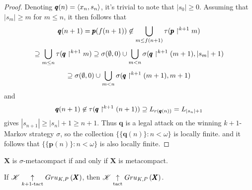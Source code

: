 \begin{proof}
  Denoting $\pmb q(n)=\langle x_n,s_n\rangle$, it's trivial to note that $|s_0|\geq 0$.
  Assuming that $|s_m|\geq m$ for $m\leq n$,
  it then follows that
    \[
      \pmb q(n+1)
        =
      \pmb p(f(n+1))
        \not\in
      \bigcup_{m\leq f(n+1)}\tau(\pmb p\restriction^{k+1} m)
    \]
    \[
        \supseteq
      \bigcup_{m\leq n}\tau(\pmb q\restriction^{k+1} m)
        \supseteq
      \sigma(\emptyset,0)
        \cup
      \bigcup_{m < n}\sigma(\pmb q\restriction^{k+1} (m+1),|s_m|+1)
    \]
    \[
        \supseteq
      \sigma(\emptyset,0)
        \cup
      \bigcup_{m < n}\sigma(\pmb q\restriction^{k+1} (m+1),m+1)
    \]
  and
    \[
      \pmb q(n+1)
        \not\in
      \tau(\pmb q\restriction^{k+1} (n+1))
        \supseteq
      L_{r(\pmb q(n))}
        =
      L_{|s_n|+1}
    \]
  gives $|s_{n+1}|\geq|s_n|+1\geq n+1$.
  Thus $\pmb q$ is a legal attack on the winning $k+1$-Markov strategy
  $\sigma$, so the collection $\{\{\pmb q(n)\}:n<\omega\}$ is locally finite.
  and it follows that $\{\{\pmb p(n)\}:n<\omega\}$ is also locally finite.
\end{proof}

\begin{cor}
  $\pmb X$ is $\sigma$-metacompact if and only if $\pmb X$ is metacompact.
\end{cor}

\begin{lem}
  If $\mathscr{K}\underset{k+1\text{-tact}}{\uparrow}Gru_{K,P}\left({\pmb X}\right)$, then
  $\mathscr{K}\underset{\text{tact}}{\uparrow}Gru_{K,P}\left({\pmb X}\right)$.
\end{lem}

